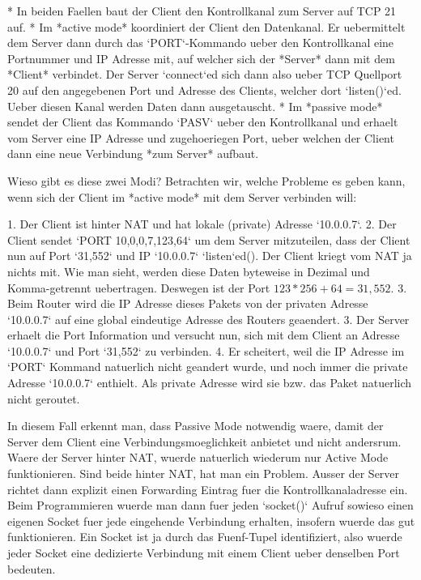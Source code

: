 * In beiden Faellen baut der Client den Kontrollkanal zum Server auf TCP 21 auf.
* Im *active mode* koordiniert der Client den Datenkanal. Er uebermittelt dem
  Server dann durch das `PORT`-Kommando ueber den Kontrollkanal eine Portnummer
  und IP Adresse mit, auf welcher sich der *Server* dann mit dem *Client*
  verbindet. Der Server `connect`ed sich dann also ueber TCP Quellport 20 auf
  den angegebenen Port und Adresse des Clients, welcher dort `listen()`ed. Ueber
  diesen Kanal werden Daten dann ausgetauscht.
* Im *passive mode* sendet der Client das Kommando `PASV` ueber den
  Kontrollkanal und erhaelt vom Server eine IP Adresse und zugehoeriegen Port,
  ueber welchen der Client dann eine neue Verbindung *zum Server* aufbaut.

Wieso gibt es diese zwei Modi? Betrachten wir, welche Probleme es geben kann,
wenn sich der Client im *active mode* mit dem Server verbinden will:

1. Der Client ist hinter NAT und hat lokale (private) Adresse `10.0.0.7`.
2. Der Client sendet `PORT 10,0,0,7,123,64` um dem Server mitzuteilen, dass der
   Client nun auf Port `31,552` und IP `10.0.0.7` `listen`ed(). Der Client
   kriegt vom NAT ja nichts mit. Wie man sieht, werden diese Daten byteweise in
   Dezimal und Komma-getrennt uebertragen. Deswegen ist der Port $123 * 256 + 64
   = 31,552$.
3. Beim Router wird die IP Adresse dieses Pakets von der privaten Adresse
   `10.0.0.7` auf eine global eindeutige Adresse des Routers geaendert.
3. Der Server erhaelt die Port Information und versucht nun, sich mit dem Client
   an Adresse `10.0.0.7` und Port `31,552` zu verbinden.
4. Er scheitert, weil die IP Adresse im `PORT` Kommand natuerlich nicht geandert
   wurde, und noch immer die private Adresse `10.0.0.7` enthielt. Als private
   Adresse wird sie bzw. das Paket natuerlich nicht geroutet.

In diesem Fall erkennt man, dass Passive Mode notwendig waere, damit der Server
dem Client eine Verbindungsmoeglichkeit anbietet und nicht andersrum. Waere der
Server hinter NAT, wuerde natuerlich wiederum nur Active Mode
funktionieren. Sind beide hinter NAT, hat man ein Problem. Ausser der Server
richtet dann explizit einen Forwarding Eintrag fuer die Kontrollkanaladresse
ein. Beim Programmieren wuerde man dann fuer jeden `socket()` Aufruf sowieso
einen eigenen Socket fuer jede eingehende Verbindung erhalten, insofern wuerde
das gut funktionieren. Ein Socket ist ja durch das Fuenf-Tupel identifiziert,
also wuerde jeder Socket eine dedizierte Verbindung mit einem Client ueber
denselben Port bedeuten.
